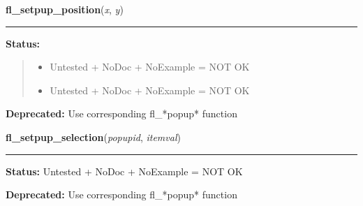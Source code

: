     \label{xformslib:deprecated:fl_setpup_position}

    \vspace{0.5ex}

\hspace{.8\funcindent}\begin{boxedminipage}{\funcwidth}

    \raggedright \textbf{fl\_setpup\_position}(\textit{x}, \textit{y})

    \vspace{-1.5ex}

    \rule{\textwidth}{0.5\fboxrule}
\setlength{\parskip}{2ex}
\setlength{\parskip}{1ex}
\textbf{Status:}
\begin{quote}
  \begin{itemize}

  \item
    \setlength{\parskip}{0.6ex}
Untested + NoDoc + NoExample = NOT OK



  \item Untested + NoDoc + NoExample = NOT OK



\end{itemize}

\end{quote}

\textbf{Deprecated:} Use corresponding fl\_*popup* function



    \end{boxedminipage}

    \label{xformslib:deprecated:fl_setpup_selection}

    \vspace{0.5ex}

\hspace{.8\funcindent}\begin{boxedminipage}{\funcwidth}

    \raggedright \textbf{fl\_setpup\_selection}(\textit{popupid}, \textit{itemval})

    \vspace{-1.5ex}

    \rule{\textwidth}{0.5\fboxrule}
\setlength{\parskip}{2ex}
\setlength{\parskip}{1ex}
\textbf{Status:} Untested + NoDoc + NoExample = NOT OK



\textbf{Deprecated:} Use corresponding fl\_*popup* function



    \end{boxedminipage}

